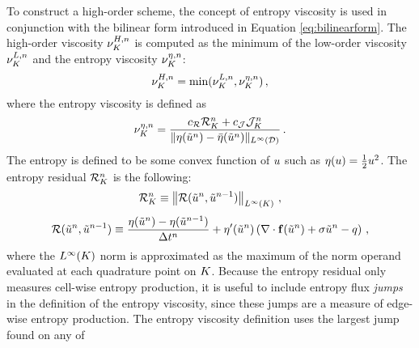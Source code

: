 To construct a high-order scheme, the concept of entropy viscosity is used in
conjunction with the bilinear form introduced in Equation
\eqref{eq:bilinearform}.  The high-order viscosity
$\highordercellviscosity[\timeindex]$ is computed as the minimum of the
low-order viscosity $\lowordercellviscosity[\timeindex]$ and the entropy viscosity
$\entropycellviscosity[\timeindex]$:
\begin{equation}\label{eq:high_order_viscosity}
   \highordercellviscosity[\timeindex] = \min(\lowordercellviscosity[\timeindex],
   \entropycellviscosity[\timeindex]) \eqc
\end{equation}
where the entropy viscosity is defined as
\begin{equation}
   \entropycellviscosity[\timeindex] = \frac{\entropyresidualcoef
   \entropyresidual_\cellindex^\timeindex
   + \entropyjumpcoef\entropyjump_\cell^\timeindex}
   {\|\entropy(\approximatescalarsolution^\timeindex)
   -\bar{\entropy}(\approximatescalarsolution^\timeindex)\|_{L^\infty(\domain)}}
   \eqp
\end{equation}
The entropy is defined to be some convex function of $\scalarsolution$ such as
$\entropy(\scalarsolution)=\frac{1}{2}\scalarsolution^2$. The entropy residual
$\entropyresidual_\cellindex^\timeindex$ is the following:
\begin{equation}
  \entropyresidual_\cellindex^\timeindex
  \equiv \left\|\entropyresidual(\approximatescalarsolution^\timeindex,
  \approximatescalarsolution^{\timeindex-1})
  \right\|_{L^\infty(\cellindex)} \eqc
\end{equation}
\begin{equation}
  \entropyresidual(\approximatescalarsolution^\timeindex,
  \approximatescalarsolution^{\timeindex-1})
  \equiv \frac{\entropy(\approximatescalarsolution^\timeindex)
  - \entropy(\approximatescalarsolution^{\timeindex-1})} 
  {\timestepsize^\timeindex}
  + \entropy'(\approximatescalarsolution^\timeindex)\pr{
  \divergence\consfluxscalar[\approximatescalarsolution^\timeindex]
  + \reactioncoef \approximatescalarsolution^\timeindex
  - \scalarsource} \eqc
\end{equation}
where the $L^\infty(\cellindex)$ norm is approximated as the maximum of the
norm operand evaluated at each quadrature point on $\cellindex$.  Because the
entropy residual only measures cell-wise entropy production, it is useful to
include entropy flux \emph{jumps} in the definition of the entropy viscosity,
since these jumps are a measure of edge-wise entropy production.
The entropy viscosity definition uses the largest jump found on any of
